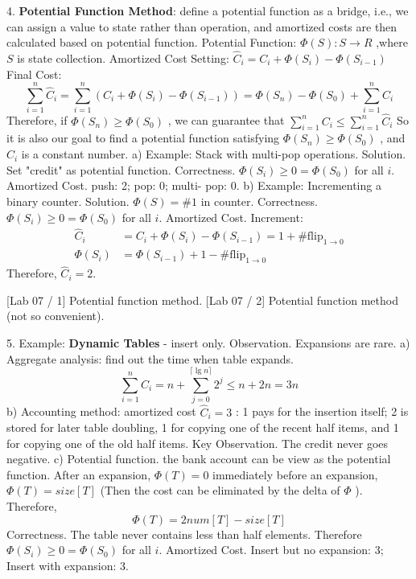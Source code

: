\documentclass[10pt,a4paper]{article}
\begin{document}
4. \textbf{Potential Function Method}: define a potential function as a bridge, i.e., we can assign a value to state rather than operation, and amortized costs are then calculated based on potential function.
Potential Function: \(\Phi (S):S\to R\) ,where \(S\) is state collection.
Amortized Cost Setting: \(\widehat{C}_{i} = C_{i} + \Phi (S_{i}) - \Phi (S_{i - 1})\)
Final Cost:
\[
\sum_{i = 1}^{n}\widehat{C}_{i} = \sum_{i = 1}^{n}\left(C_{i} + \Phi (S_{i}) - \Phi (S_{i - 1})\right) = \Phi (S_{n}) - \Phi (S_{0}) + \sum_{i = 1}^{n}C_{i}
\]
Therefore, if \(\Phi (S_{n})\geq \Phi (S_{0})\) , we can guarantee that \(\sum_{i = 1}^{n}C_{i}\leq \sum_{i = 1}^{n}\widehat{C}_{i}\)
So it is also our goal to find a potential function satisfying \(\Phi (S_{n})\geq \Phi (S_{0})\) , and \(\widehat{C}_{i}\) is a constant number.
a) Example: Stack with multi-pop operations.
Solution. Set "credit" as potential function.
Correctness. \(\Phi (S_{i})\geq 0 = \Phi (S_{0})\) for all \(i\).
Amortized Cost. push: 2; pop: 0; multi- pop: 0.
b) Example: Incrementing a binary counter.
Solution. \(\Phi (S) = \# 1\) in counter.
Correctness. \(\Phi (S_{i})\geq 0 = \Phi (S_{0})\) for all \(i\).
Amortized Cost. Increment:
\begin{align*}
\widehat{C}_{i} &= C_{i} + \Phi (S_{i}) - \Phi (S_{i - 1}) = 1 + \# \mathrm{flip}_{1\to 0} \\
\Phi (S_{i}) &= \Phi (S_{i - 1}) + 1 - \# \mathrm{flip}_{1\to 0}
\end{align*}
Therefore, \(\widehat{C}_{i} = 2\).

[Lab 07 / 1] Potential function method.
[Lab 07 / 2] Potential function method (not so convenient).

5. Example: \textbf{Dynamic Tables} - insert only.
Observation. Expansions are rare.
a) Aggregate analysis: find out the time when table expands.
\[
\sum_{i = 1}^{n}C_{i} = n + \sum_{j = 0}^{\lceil \lg n\rceil}2^{j}\leq n + 2n = 3n
\]
b) Accounting method: amortized cost \(\widehat{C}_{i} = 3\) : 1 pays for the insertion itself; 2 is stored for later table doubling, 1 for copying one of the recent half items, and 1 for copying one of the old half items.
Key Observation. The credit never goes negative.
c) Potential function. the bank account can be view as the potential function. After an expansion, \(\Phi (T) = 0\) immediately before an expansion, \(\Phi (T) = size[T]\) (Then the cost can be eliminated by the delta of \(\Phi\) ). Therefore,
\[
\Phi (T) = 2num[T] - size[T]
\]
Correctness. The table never contains less than half elements. Therefore \(\Phi (S_{i})\geq 0 = \Phi (S_{0})\) for all \(i\).
Amortized Cost. Insert but no expansion: 3; Insert with expansion: 3.
\end{document}
